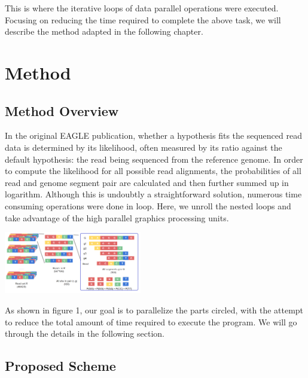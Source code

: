 \documentclass{PHlab-thesis}
\begin{document}
This is where the iterative loops of data parallel operations were executed. Focusing on reducing the time required to complete the above task, we will describe the method adapted in the following chapter.

\chapter{Method}
\section{Method Overview}
In the original EAGLE publication, whether a hypothesis fits the sequenced read data is determined by its likelihood, often measured by its ratio against the default hypothesis: the read being sequenced from the reference genome. In order to compute the likelihood for all possible read alignments, the probabilities of all read and genome segment pair are calculated and then further summed up in logarithm. Although this is undoubtly a straightforward solution, numerous time consuming operations were done in loop. Here, we unroll the nested loops and take advantage of the high parallel graphics processing units. 

\includegraphics[width=6cm]{figures/overview.png}


As shown in figure 1, our goal is to parallelize the parts circled, with the attempt to reduce the total amount of time required to execute the program. We will go through the details in the following section.

\section{Proposed Scheme}
\end{document}
